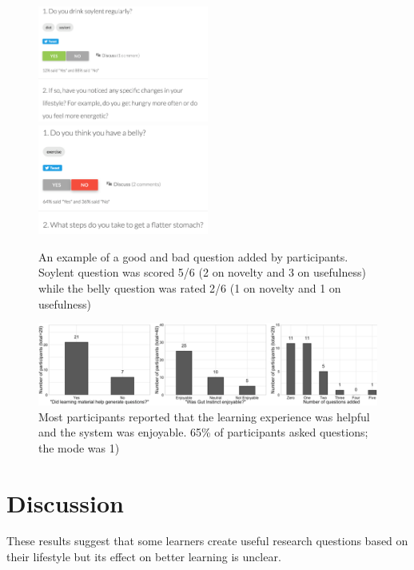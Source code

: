 \begin{figure}[h] 
  \centering
  \includegraphics[width=0.5\textwidth]{figures/gutinstinct/gi-8a.png}
  \includegraphics[width=0.5\textwidth]{figures/gutinstinct/gi-8b.png}
  \caption[]
{An example of a good and bad question added by participants. Soylent question was scored 5/6 (2 on novelty and 3 on usefulness) while the belly question was rated 2/6 (1 on novelty and 1 on usefulness) }
  \label{fig:gi-8}
\end{figure}


\begin{figure}[h] 
  \centering
  \includegraphics[width=1.0\textwidth]{figures/gutinstinct/gi-9.png}
  \caption[]
{Most participants reported that the learning experience was helpful and the system was enjoyable. 65\% of participants asked questions; the mode was 1) }
  \label{fig:gi-8}
\end{figure}

\section{Discussion}
These results suggest that some learners create useful research questions based on their lifestyle but its effect on better learning is unclear.

